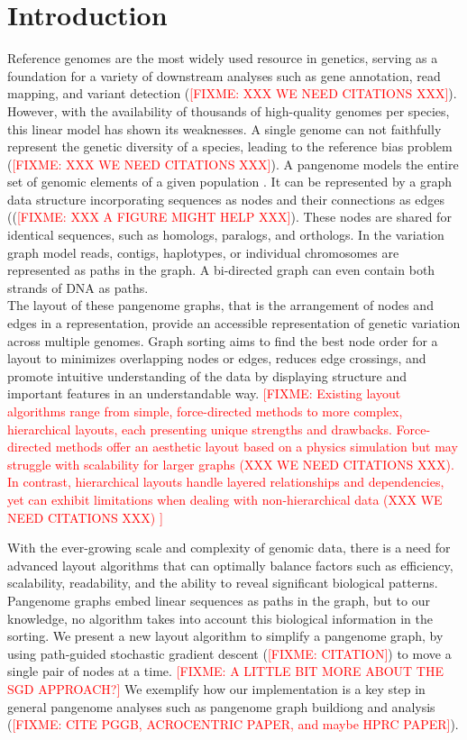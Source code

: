 \documentclass{bioinfo}
\theoremstyle{definition}
\newcommand{\red}[1]{{\textcolor{Red}{#1}}}
\newcommand{\FIXME}[1]{\red{[FIXME: #1]}}
\begin{document}
\section{Introduction}
Reference genomes are the most widely used resource in genetics, serving as a foundation for a variety of downstream analyses
such as gene annotation, read mapping, and variant detection (\FIXME{XXX WE NEED CITATIONS XXX}).
However, with the availability of thousands of high-quality genomes per species, this linear model has shown its weaknesses.
A single genome can not faithfully represent the genetic diversity of a species, leading to the reference bias problem (\FIXME{XXX WE NEED CITATIONS XXX}).
A pangenome models the entire set of genomic elements of a given population \citep{Tettelin_2008,cpang2018,Eizenga_2020}.
It can be represented by a graph data structure incorporating sequences as nodes and their connections as edges ((\FIXME{XXX A FIGURE MIGHT HELP XXX}).
These nodes are shared for identical sequences, such as homologs, paralogs, and orthologs.
In the variation graph model \citep{Garrison:2018} reads, contigs, haplotypes, or individual chromosomes are represented as paths in the graph.
A bi-directed graph can even contain both strands of DNA as paths. \\

The layout of these pangenome graphs, that is the arrangement of nodes and edges in a representation, provide an accessible representation of genetic variation across multiple genomes.
Graph sorting aims to find the best node order for a layout to minimizes overlapping nodes or edges, reduces edge crossings, and promote intuitive understanding of the data by displaying structure and important features in an understandable way.
\FIXME{
	Existing layout algorithms range from simple, force-directed methods to more complex, hierarchical layouts, each presenting unique strengths and drawbacks.
	Force-directed methods offer an aesthetic layout based on a physics simulation but may struggle with scalability for larger graphs (XXX WE NEED CITATIONS XXX).
	In contrast, hierarchical layouts handle layered relationships and dependencies, yet can exhibit limitations when dealing with non-hierarchical data (XXX WE NEED CITATIONS XXX)
}

With the ever-growing scale and complexity of genomic data, there is a need for advanced layout algorithms that can optimally balance factors such as
efficiency, scalability, readability, and the ability to reveal significant biological patterns.
Pangenome graphs embed linear sequences as paths in the graph, but to our knowledge, no algorithm takes into account this biological information in the sorting.
We present a new layout algorithm to simplify a pangenome graph, by using path-guided stochastic gradient descent (\FIXME{CITATION}) to move a single pair of nodes at a time.
\FIXME{A LITTLE BIT MORE ABOUT THE SGD APPROACH?}
We exemplify how our implementation is a key step in general pangenome analyses such as pangenome graph buildiong and analysis (\FIXME{CITE PGGB, ACROCENTRIC PAPER, and maybe HPRC PAPER}).
\end{document}
